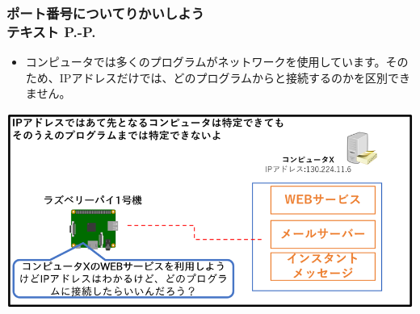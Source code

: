 \begin{frame}[fragile]
	\frametitle{\large{ポート番号についてりかいしよう\\テキスト P.\pageref{1:P:port}-P.\pageref{1:P:DNS}}~~~}
    \begin{itemize}\small
                \item コンピュータでは多くのプログラムがネットワークを使用しています。そのため、IPアドレスだけでは、どのプログラムからと接続するのかを区別できません。
            \end{itemize}
            
			\begin{minipage}{\textwidth}
                {\upshape
                  \includegraphics[width=\textwidth]{slide07-img/slide07-img011.png}}
            \end{minipage}
\end{frame}


